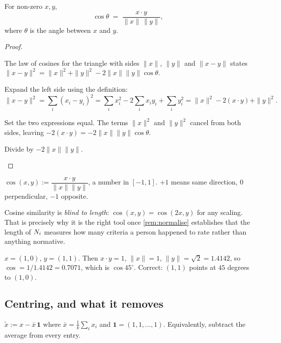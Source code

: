 \begin{theorem}
\label{thm:cosangle}
For non-zero $x,y$,
\[
\cos\theta \;=\; \frac{x\cdot y}{\|x\|\,\|y\|},
\]
where $\theta$ is the angle between $x$ and $y$.
\end{theorem}
\begin{proof}
\begin{steps}
\item The law of cosines for the triangle with sides $\|x\|$, $\|y\|$
and $\|x-y\|$ states
$\|x-y\|^2 = \|x\|^2+\|y\|^2-2\|x\|\|y\|\cos\theta$.
\item Expand the left side using the definition:
\[
\|x-y\|^2=\sum_i (x_i-y_i)^2=\sum_i x_i^2-2\sum_i x_iy_i+\sum_i y_i^2
=\|x\|^2-2(x\cdot y)+\|y\|^2 .
\]
\item Set the two expressions equal. The terms $\|x\|^2$ and $\|y\|^2$
cancel from both sides, leaving $-2(x\cdot y) = -2\|x\|\|y\|\cos\theta$.
\item Divide by $-2\|x\|\|y\|$.
\end{steps}
\end{proof}

\begin{definition}
$\cos(x,y) := \dfrac{x\cdot y}{\|x\|\|y\|}$, a number in $[-1,1]$.
$+1$ means same direction, $0$ perpendicular, $-1$ opposite.
\end{definition}

\begin{remark}
Cosine similarity is \emph{blind to length}: $\cos(x,y)=\cos(2x,y)$ for any
scaling. That is precisely why it is the right tool once \cref{rem:normalise}
establishes that the length of $N_i$ measures how many criteria a person
happened to rate rather than anything normative.
\end{remark}

 $x=(1,0)$, $y=(1,1)$. Then $x\cdot y = 1$,
$\|x\|=1$, $\|y\|=\sqrt2=1.4142$, so $\cos = 1/1.4142 = 0.7071$, which is
$\cos 45^\circ$. Correct: $(1,1)$ points at $45$ degrees to $(1,0)$.

\subsection{Centring, and what it removes}

\begin{definition}
$\tilde x := x - \bar x\,\mathbf{1}$ where $\bar x = \tfrac1k\sum_i x_i$ and
$\mathbf{1}=(1,1,\dots,1)$. Equivalently, subtract the average from every entry.
\end{definition}

